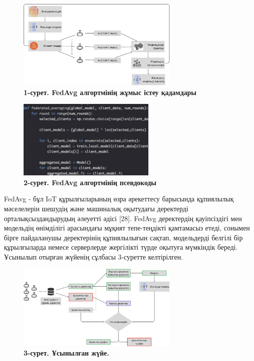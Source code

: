 \begin{figure}[H]
	\centering
	\includegraphics[width=0.7\textwidth]{assets/199}
	\caption*{\bfseries 1-сурет. FedAvg алгортмінің жұмыс істеу қадамдары}
\end{figure}




\begin{figure}[H]
	\centering
	\includegraphics[width=0.6\textwidth]{assets/200}
	\caption*{\bfseries 2-сурет. FedAvg алгортмінің псевдокоды}
\end{figure}


\begin{multicols}{2}


FedAvg - бұл IoT құрылғыларының өзра әрекеттесу барысында құпиялылық
мәселелерін шешудің және машиналық оқытудағы деректерді
орталықсыздандырудың әлеуетті әдісі {[}28{]}. FedAvg деректердің
қауіпсіздігі мен модельдің өнімділігі арасындағы мұқият тепе-теңдікті
қамтамасыз етеді, сонымен бірге пайдаланушы деректерінің құпиялылығын
сақтап, модельдерді белгілі бір құрылғыларда немесе серверлерде
жергілікті түрде оқытуға мүмкіндік береді. Ұсынылып отырған жүйенің
сұлбасы 3-суретте келтірілген.
\end{multicols}

\begin{figure}[H]
	\centering
	\includegraphics[width=0.7\textwidth]{assets/201}
	\caption*{\bfseries 3-сурет. Ұсынылған жүйе.}
\end{figure}

